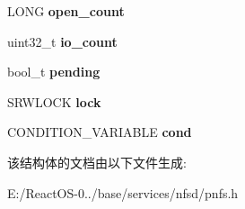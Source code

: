 \begin{DoxyCompactItemize}
\item 
\mbox{\label{struct____pnfs__layout__state_a3ed6056bc9c99effd5275f1e736e5d24}} 
L\+O\+NG {\bfseries open\+\_\+count}
\item 
\mbox{\label{struct____pnfs__layout__state_ace8fa1632611de209d97787335c9c75d}} 
uint32\+\_\+t {\bfseries io\+\_\+count}
\item 
\mbox{\label{struct____pnfs__layout__state_a27033316b72515a0e37a0e95774d7b52}} 
bool\+\_\+t {\bfseries pending}
\item 
\mbox{\label{struct____pnfs__layout__state_a40164f7eb5a8e9dc32a3573b37ac0b6b}} 
S\+R\+W\+L\+O\+CK {\bfseries lock}
\item 
\mbox{\label{struct____pnfs__layout__state_aa1c52b27947c2c4ae3337893c1da647f}} 
C\+O\+N\+D\+I\+T\+I\+O\+N\+\_\+\+V\+A\+R\+I\+A\+B\+LE {\bfseries cond}
\end{DoxyCompactItemize}


该结构体的文档由以下文件生成\+:\begin{DoxyCompactItemize}
\item 
E\+:/\+React\+O\+S-\/0../base/services/nfsd/pnfs.\+h\end{DoxyCompactItemize}

